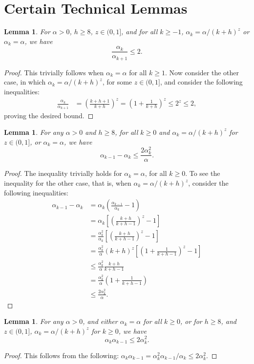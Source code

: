 \documentclass{article}
\newcommand{\lrp}[1]{\left( #1 \right)}
\newcommand{\lrs}[1]{\left[ #1 \right]}
\newtheorem{lemma}[theorem]{Lemma}
\begin{document}
\section{Certain Technical Lemmas}
\begin{lemma}\label{lem:ratioofalpha}
    For $\alpha > 0$, $h \ge 8$, $z\in (0,1]$, and for all $k\ge -1$,  $\alpha_k = \alpha/(k+h)^z$ or $\alpha_k = \alpha$, we have
    \[ \frac{\alpha_k}{\alpha_{k+1}}\le 2. \]
\end{lemma}
\begin{proof}
    This trivially follows when $\alpha_k = \alpha$ for all $k\ge 1$. Now consider the other case, in which $\alpha_k = \alpha/(k+h)^z$, for some $z\in (0,1]$, and consider the following inequalities: 
    \begin{align*}
        \frac{\alpha_k}{\alpha_{k+1}} &= \lrp{\frac{k+h+1}{k+h}}^z = \lrp{1+ \frac{1}{k+h}}^z \le 2^z \le 2,
    \end{align*}
    proving the desired bound.
\end{proof}

\begin{lemma}\label{lem:diffofalpha}
    For any $\alpha > 0$ and $h \ge 8$, for all $k\ge 0$ and $\alpha_k = \alpha/(k+h)^z$ for $z\in (0,1]$, or $\alpha_k = \alpha
    $, we have
    \[ \alpha_{k-1} - \alpha_k \le \frac{2\alpha^2_k}{\alpha}. \]
\end{lemma}
\begin{proof}
    The inequality trivially holds for $\alpha_k = \alpha$, for all $k\ge 0$. To see the inequality for the other case, that is, when $\alpha_k = \alpha/(k+h)^z$, consider the following inequalities:
    \begin{align*}
        \alpha_{k-1} - \alpha_k &= \alpha_k \lrp{ \frac{\alpha_{k-1}}{\alpha_k} - 1 }\\
        &= \alpha_k \lrs{ \lrp{\frac{k+h}{k+h-1}}^z - 1 }\\
        &= \frac{\alpha^2_k}{\alpha_k} \lrs{ \lrp{\frac{k+h}{k+h-1}}^z - 1 }\\
        &= \frac{\alpha^2_k}{\alpha} (k+h)^z \lrs{ \lrp{1 + \frac{1}{k+h-1}}^z - 1 }\\
        &\le \frac{\alpha^2_k}{\alpha} \frac{k+h}{k+h-1} \\
        &= \frac{\alpha^2_k}{\alpha} \lrp{1 + \frac{1}{k+h-1}} \\
        &\le \frac{2\alpha^2_k}{\alpha}.
    \end{align*}
\end{proof}
\begin{lemma}\label{lem:prodofalpha}
    For any $\alpha > 0$, and either $\alpha_k = \alpha$ for all $k\ge 0$, or for $h \ge 8$, and $z\in(0,1]$,  $\alpha_k = \alpha/(k+h)^z$ for $k \ge 0$, we have \[ \alpha_k \alpha_{k-1} \le 2\alpha^2_k .\]
\end{lemma}
\begin{proof}
    This follows from the following: \( \alpha_k \alpha_{k-1}  = \alpha^2_k \alpha_{k-1}/\alpha_k \le 2 \alpha^2_k.\)
\end{proof}
\end{document}
